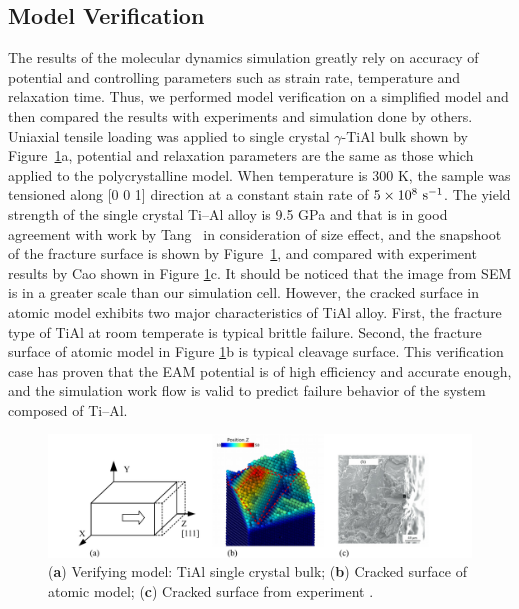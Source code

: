 \documentclass[materials,article,accept,moreauthors,pdftex,10pt,a4paper]{Definitions/mdpi}
\begin{document}
\subsection{Model Verification}
The results of the molecular dynamics simulation greatly rely on accuracy of potential and controlling parameters such as strain rate, temperature and relaxation time. Thus, we performed model verification on a simplified model and then compared the results with experiments and simulation done by others.  Uniaxial tensile loading  was applied to single crystal $\gamma$-TiAl bulk shown by Figure~\ref{fig:verify}a, potential and relaxation parameters are the same as those which applied to the polycrystalline model. When temperature is 300 K, the sample was tensioned along [0 0 1] direction at a constant stain rate of $5\times10^8\ \rm{s}^{-1}$. The yield strength of the single crystal Ti--Al alloy is 9.5 GPa  and that is in good agreement with  work by Tang~\cite{Tang2010} in consideration of size effect, and the snapshoot of the fracture surface is shown by Figure~\ref{fig:verify}, and compared with experiment results by Cao \cite{CHEN2015365} shown in Figure \ref{fig:verify}c. It should be noticed that the image from SEM is in a greater scale than our simulation cell. However, the cracked surface in atomic model exhibits two major characteristics of TiAl alloy. First, the fracture type of TiAl at room temperate is typical brittle failure. Second, the fracture surface  of atomic model in Figure \ref{fig:verify}b is typical cleavage surface. This verification case has proven that the EAM potential is of high efficiency and accurate enough, and the simulation work flow is valid to predict failure behavior of  the system composed of Ti--Al.


\begin{figure}[H]
\centering
\includegraphics[width=1\linewidth]{img/cold-fracture2}
\caption{(\textbf{a}) Verifying model: TiAl single crystal bulk; (\textbf{b}) Cracked surface of atomic model; (\textbf{c}) Cracked surface from experiment \cite{CHEN2015365}.}
\label{fig:verify}
\end{figure}
\end{document}
